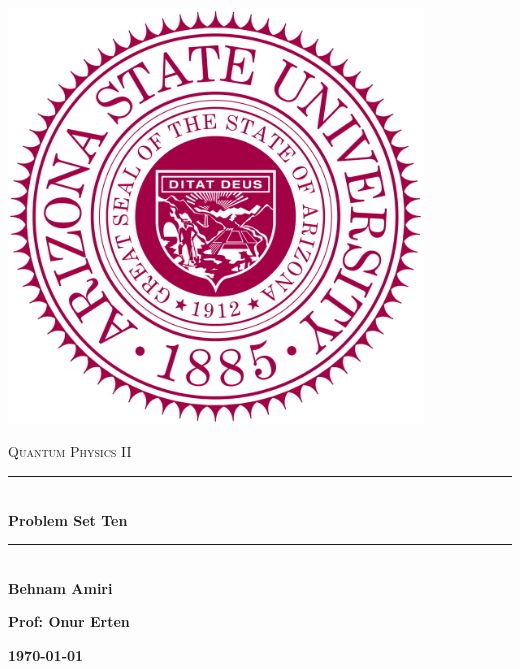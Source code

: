 \documentclass[fleqn]{article}
\begin{document}
  \begin{titlepage}

    \newcommand{\HRule}{\rule{\linewidth}{0.5mm}}

    \center

    \begin{center}
      \includegraphics[height=11cm, width=11cm]{asu.png}
    \end{center}

    \vline

    \textsc{\LARGE Quantum Physics II}\\[1.5cm]

    \HRule \\[0.5cm]
    { \huge \bfseries Problem Set Ten}\\[0.4cm] 
    \HRule \\[1.0cm]

    \textbf{Behnam Amiri}

    \bigbreak

    \textbf{Prof: Onur Erten}

    \bigbreak

    \textbf{{\large \today}\\[2cm]}

    \vfill

  \end{titlepage}
\end{document}

